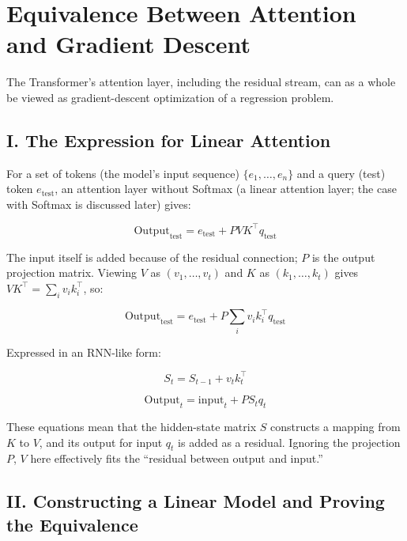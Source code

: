 \setcounter{section}{5}

\hypertarget{equivalence-between-attention-and-gradient-descent}{%
\section{Equivalence Between Attention and Gradient Descent}\label{equivalence-between-attention-and-gradient-descent}}

The Transformer's attention layer, including the residual stream, can as a whole be viewed as gradient-descent optimization of a regression problem.

\hypertarget{i.-the-expression-for-linear-attention}{%
\subsection{I. The Expression for Linear Attention}\label{i.-the-expression-for-linear-attention}}

For a set of tokens (the model's input sequence) \(\{e_1,\ldots,e_n\}\) and a query (test) token \(e_{\mathrm{test}}\), an attention layer without Softmax (a linear attention layer; the case with Softmax is discussed later) gives:

\[
\mathrm{Output}_{\mathrm{test}}=e_{\mathrm{test}}+PVK^\top q_{\mathrm{test}}
\tag{1}
\]

The input itself is added because of the residual connection; \(P\) is the output projection matrix. Viewing \(V\) as \((v_1,\ldots,v_t)\) and \(K\) as \((k_1,\ldots,k_t)\) gives \(VK^\top=\sum_i v_i k_i^\top\), so:

\[
\mathrm{Output}_{\mathrm{test}}=e_{\mathrm{test}}+P\sum_i v_i k_i^\top q_{\mathrm{test}}
\tag{2}
\]

Expressed in an RNN-like form:

\[
S_t=S_{t-1}+v_t k_t^\top
\]

\[
\mathrm{Output}_t=\mathrm{input}_t+PS_tq_t
\]

These equations mean that the hidden-state matrix \(S\) constructs a mapping from \(K\) to \(V\), and its output for input \(q_t\) is added as a residual. Ignoring the projection \(P\), \(V\) here effectively fits the ``residual between output and input.''

\hypertarget{ii.-constructing-a-linear-model-and-proving-the-equivalence}{%
\subsection{II. Constructing a Linear Model and Proving the Equivalence}\label{ii.-constructing-a-linear-model-and-proving-the-equivalence}}

